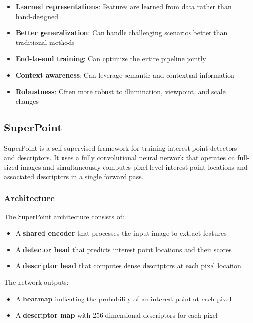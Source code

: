 \documentclass[11pt,a4paper]{article}
\theoremstyle{definition}
\theoremstyle{plain}
\theoremstyle{remark}
\begin{document}
\begin{tcolorbox}[colback=blue!5!white,colframe=blue!75!black,title=\textbf{Advantages of Deep Learning for Feature Matching}]
\begin{itemize}
    \item \textbf{Learned representations}: Features are learned from data rather than hand-designed
    \item \textbf{Better generalization}: Can handle challenging scenarios better than traditional methods
    \item \textbf{End-to-end training}: Can optimize the entire pipeline jointly
    \item \textbf{Context awareness}: Can leverage semantic and contextual information
    \item \textbf{Robustness}: Often more robust to illumination, viewpoint, and scale changes
\end{itemize}
\end{tcolorbox}

\subsection{SuperPoint}

SuperPoint is a self-supervised framework for training interest point detectors and descriptors. It uses a fully convolutional neural network that operates on full-sized images and simultaneously computes pixel-level interest point locations and associated descriptors in a single forward pass.

\subsubsection{Architecture}

The SuperPoint architecture consists of:
\begin{itemize}
    \item A \textbf{shared encoder} that processes the input image to extract features
    \item A \textbf{detector head} that predicts interest point locations and their scores
    \item A \textbf{descriptor head} that computes dense descriptors at each pixel location
\end{itemize}

The network outputs:
\begin{itemize}
    \item A \textbf{heatmap} indicating the probability of an interest point at each pixel
    \item A \textbf{descriptor map} with 256-dimensional descriptors for each pixel
\end{itemize}
\end{document}
